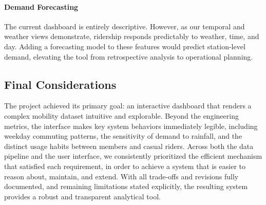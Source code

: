 \paragraph{Demand Forecasting}
The current dashboard is entirely descriptive.
However, as our temporal and weather views demonstrate, ridership responds predictably to weather, time, and day.
Adding a forecasting model to these features would predict station-level demand, elevating the tool from retrospective analysis to operational planning.

\subsection{Final Considerations}
The project achieved its primary goal: an interactive dashboard that renders a complex mobility dataset intuitive and explorable.
Beyond the engineering metrics, the interface makes key system behaviors immediately legible, including weekday commuting patterns, the sensitivity of demand to rainfall, and the distinct usage habits between members and casual riders.
Across both the data pipeline and the user interface, we consistently prioritized the efficient mechanism that satisfied each requirement, in order to achieve a system that is easier to reason about, maintain, and extend.
With all trade-offs and revisions fully documented, and remaining limitations stated explicitly, the resulting system provides a robust and transparent analytical tool.